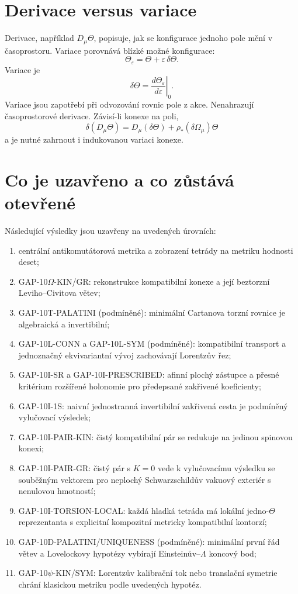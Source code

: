 \section{Derivace versus variace}
Derivace, například $D_\mu\Theta$, popisuje, jak se konfigurace jednoho pole
mění v časoprostoru. Variace porovnává blízké možné konfigurace:
\[
 \Theta_\varepsilon=\Theta+\varepsilon\,\delta\Theta.
\]
Variace je
\[
 \delta\Theta=
 \left.\frac{d\Theta_\varepsilon}{d\varepsilon}\right|_{0}.
\]
Variace jsou zapotřebí při odvozování rovnic pole z akce. Nenahrazují
časoprostorové derivace. Závisí-li konexe na poli,
\[
 \delta(D_\mu\Theta)
 =D_\mu(\delta\Theta)+\rho_*(\delta\Omega_\mu)\Theta
\]
a je nutné zahrnout i indukovanou variaci konexe.

\section{Co je uzavřeno a co zůstává otevřené}
Následující výsledky jsou uzavřeny na uvedených úrovních:
\begin{enumerate}
 \item centrální antikomutátorová metrika a zobrazení tetrády na metriku
       hodnosti deset;
 \item GAP-10$\Omega$-KIN/GR: rekonstrukce kompatibilní konexe a její
       beztorzní Leviho--Civitova větev;
 \item GAP-10T-PALATINI (podmíněné): minimální Cartanova torzní rovnice je
       algebraická a invertibilní;
 \item GAP-10L-CONN a GAP-10L-SYM (podmíněné): kompatibilní transport a
       jednoznačný ekvivariantní vývoj zachovávají Lorentzův řez;
 \item GAP-10I-SR a GAP-10I-PRESCRIBED: afinní plochý zástupce a
       přesné kritérium rozšířené holonomie pro předepsané zakřivené koeficienty;
 \item GAP-10I-1S: naivní jednostranná invertibilní zakřivená cesta je
       podmíněný vylučovací výsledek;
 \item GAP-10I-PAIR-KIN: čistý kompatibilní pár se redukuje na jedinou
       spinovou konexi;
 \item GAP-10I-PAIR-GR: čistý pár s $K=0$ vede k vylučovacímu výsledku se souběžným
       vektorem pro neplochý Schwarzschildův vakuový exteriér s nenulovou
       hmotností;
 \item GAP-10I-TORSION-LOCAL: každá hladká tetráda má lokální jedno-$\Theta$
       reprezentanta s explicitní kompozitní metricky kompatibilní kontorzí;
 \item GAP-10D-PALATINI/UNIQUENESS (podmíněné): minimální první řád
       větev a Lovelockovy hypotézy vybírají Einsteinův--$\Lambda$ koncový bod;
 \item GAP-10$\psi$-KIN/SYM: Lorentzův kalibrační tok nebo translační symetrie
       chrání klasickou metriku podle uvedených hypotéz.
\end{enumerate}

